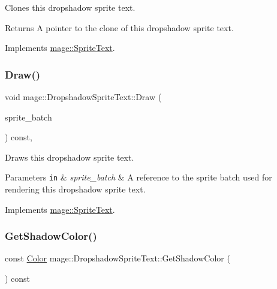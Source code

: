 Clones this dropshadow sprite text.

\begin{DoxyReturn}{Returns}
A pointer to the clone of this dropshadow sprite text. 
\end{DoxyReturn}


Implements \hyperlink{classmage_1_1_sprite_text_aa2c63346f5ad7f63f7a6d474df3556ef}{mage\+::\+Sprite\+Text}.

\hypertarget{classmage_1_1_dropshadow_sprite_text_af76422c9812d7dc38e9b98e587103c67}{}\label{classmage_1_1_dropshadow_sprite_text_af76422c9812d7dc38e9b98e587103c67} 
\subsubsection{\texorpdfstring{Draw()}{Draw()}}
{\footnotesize\ttfamily void mage\+::\+Dropshadow\+Sprite\+Text\+::\+Draw (\begin{DoxyParamCaption}\item[{\hyperlink{classmage_1_1_sprite_batch}{Sprite\+Batch} \&}]{sprite\+\_\+batch }\end{DoxyParamCaption}) const\hspace{0.3cm}{\ttfamily [override]}, {\ttfamily [virtual]}}

Draws this dropshadow sprite text.


\begin{DoxyParams}[1]{Parameters}
\mbox{\tt in}  & {\em sprite\+\_\+batch} & A reference to the sprite batch used for rendering this dropshadow sprite text. \\
\hline
\end{DoxyParams}


Implements \hyperlink{classmage_1_1_sprite_text_a45d5ac8410d5a46b26e8491946a2ad9e}{mage\+::\+Sprite\+Text}.

\hypertarget{classmage_1_1_dropshadow_sprite_text_a5aebe32b778feb5e4f82ff11fbc4636f}{}\label{classmage_1_1_dropshadow_sprite_text_a5aebe32b778feb5e4f82ff11fbc4636f} 
\subsubsection{\texorpdfstring{Get\+Shadow\+Color()}{GetShadowColor()}}
{\footnotesize\ttfamily const \hyperlink{structmage_1_1_color}{Color} mage\+::\+Dropshadow\+Sprite\+Text\+::\+Get\+Shadow\+Color (\begin{DoxyParamCaption}{ }\end{DoxyParamCaption}) const\hspace{0.3cm}{\ttfamily [noexcept]}}

